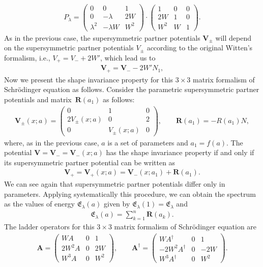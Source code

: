 \documentclass[10pt,a4paper]{amsart}
\numberwithin{equation}{section}
\begin{document}
\begin{gather*}
P_\lambda =
\begin{pmatrix} 0 & 0 & 1 \\ 0 & - \lambda & 2 W \\ \lambda^2 & -\lambda W & W^2 \end{pmatrix} \cdot \begin{pmatrix} 1 & 0 & 0 \\ 2W & 1 & 0 \\ W^2 & W & 1 \end{pmatrix}\!.
\end{gather*}
As in the previous case, the supersymmetric partner potentials $\mathbf{V}_\pm$ will depend on the supersymmetric partner potentials $V_\pm$ according to the original Witten's formalism, i.e., $V_+=V_-+2W'$, which lead us to
\begin{gather*}
\mathbf{V}_+=\mathbf{V}_- -2W'N_1,
\end{gather*}
Now we present the shape invariance property for this $3\times 3$ matrix formalism of Schr\"odinger equation as follows. Consider the parametric supersymmetric partner potentials and matrix~$\mathbf{R}(a_1)$ as follows:
\begin{gather*}
\mathbf{V}_\pm(x;a)=\begin{pmatrix}0&1&0\\2V_{\pm}(x;a)&0&2\\0&V_{\pm}(x;a)&0\end{pmatrix}\!,\qquad \mathbf{R}(a_1)=-R(a_1)N,
\end{gather*}
where, as in the previous case, $a$ is a set of parameters and $a_1=f(a)$. The potential $\mathbf{V}=\mathbf{V}_-=\mathbf{V}_-(x;a)$ has the shape invariance property if and only if its supersymmetric partner potential can be written as
\begin{gather*}
\mathbf{V}_+=\mathbf{V}_+(x;a)=\mathbf{V}_-(x;a_1)+\mathbf{R}(a_1).
\end{gather*}
We can see again that supersymmetric partner potentials differ only in parameters. Applying systematically this procedure, we can obtain the spectrum as the values of energy $\mathfrak E_\lambda (a)$
given by $ \mathfrak E_\lambda (1) = \mathfrak E_\lambda $ and
\begin{gather*}
\mathfrak E_\lambda (a)=\sum_{k=1}^n \mathbf{R}(a_k).
\end{gather*}
The ladder operators for this $3\times 3$ matrix formalism of Schr\"odinger equation are
\begin{gather*}
\mathbf{A}=\begin{pmatrix}WA&0&1\\2W^2A&0&2W\\W^3A&0&W^2\end{pmatrix}\!, \qquad
\mathbf{A}^\dag=\begin{pmatrix}
WA^\dag&0&1\\-2W^2A^\dag&0&-2W\\W^3A^\dag&0&W^2
\end{pmatrix}\!.
\end{gather*}
\end{document}
